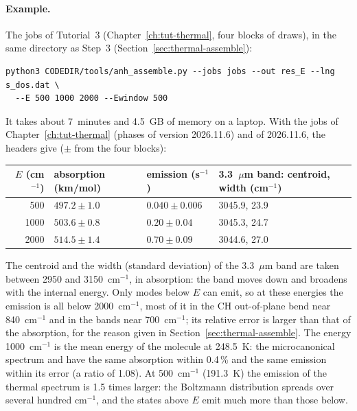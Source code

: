 \paragraph{Example.} The jobs of Tutorial~3 (Chapter~\ref{ch:tut-thermal},
four blocks of draws), in the same directory as Step~3
(Section~\ref{sec:thermal-assemble}):
\begin{lstlisting}
python3 CODEDIR/tools/anh_assemble.py --jobs jobs --out res_E --lng s_dos.dat \
  --E 500 1000 2000 --Ewindow 500
\end{lstlisting}
It takes about 7~minutes and 4.5~GB of memory on a laptop. With the jobs
of Chapter~\ref{ch:tut-thermal} (phases of version 2026.11.6) and
\prog{anh\_assemble.py} of 2026.11.6, the headers give
($\pm$ from the four blocks):
\begin{center}
\footnotesize
\begin{tabular}{rlll}
\toprule
$E$ (cm$^{-1}$) & absorption (km/mol) & emission (s$^{-1}$) & 3.3~$\mu$m band: centroid, width (cm$^{-1}$) \\
\midrule
500 & $497.2\pm1.0$ & $0.040\pm0.006$ & 3045.9, 23.9 \\
1000 & $503.6\pm0.8$ & $0.20\pm0.04$ & 3045.3, 24.7 \\
2000 & $514.5\pm1.4$ & $0.70\pm0.09$ & 3044.6, 27.0 \\
\bottomrule
\end{tabular}
\end{center}
The centroid and the width (standard deviation) of the 3.3~$\mu$m band
are taken between 2950 and 3150~cm$^{-1}$, in absorption: the band moves
down and broadens with the internal energy. Only modes below $E$ can emit,
so at these energies the emission is all below 2000~cm$^{-1}$, most of it
in the CH out-of-plane bend near 840~cm$^{-1}$ and in the bands near
700~cm$^{-1}$; its relative error is larger than that of the absorption,
for the reason given in Section~\ref{sec:thermal-assemble}. The energy
1000~cm$^{-1}$ is the mean energy of the molecule at 248.5~K: the
microcanonical spectrum and \file{thermal\_T248.5.dat} have the same
absorption within 0.4\,\% and the same emission within its error (a ratio
of 1.08). At 500~cm$^{-1}$ (191.3~K) the emission of the thermal spectrum
is 1.5 times larger: the Boltzmann distribution spreads over several
hundred cm$^{-1}$, and the states above $E$ emit much more than those
below.

